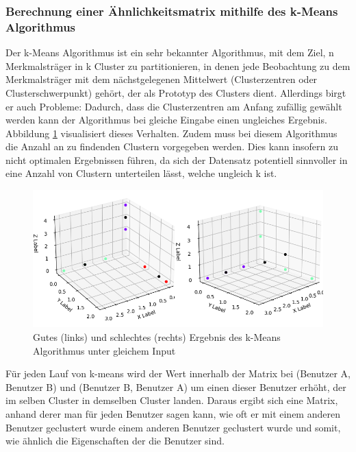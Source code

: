 \subsubsection{Berechnung einer Ähnlichkeitsmatrix mithilfe des k-Means Algorithmus}
Der k-Means Algorithmus ist ein sehr bekannter Algorithmus, mit dem Ziel, n Merkmalsträger in k Cluster zu partitionieren, in denen jede Beobachtung zu dem Merkmalsträger mit dem nächstgelegenen Mittelwert (Clusterzentren oder Clusterschwerpunkt) gehört, der als Prototyp des Clusters dient. Allerdings birgt er auch Probleme: Dadurch, dass die Clusterzentren am Anfang zufällig gewählt werden kann der Algorithmus bei gleiche Eingabe einen ungleiches Ergebnis. Abbildung \ref{fig:kmeans} visualisiert dieses Verhalten. Zudem muss bei diesem Algorithmus die Anzahl an zu findenden Clustern vorgegeben werden. Dies kann insofern zu nicht optimalen Ergebnissen führen, da sich der Datensatz potentiell sinnvoller in eine Anzahl von Clustern unterteilen lässt, welche ungleich k ist. 
\begin{figure}[h]
	\centering
	\includegraphics[width=\linewidth]{images/gutes_schlechtes_kmeans}
	\caption[]{Gutes (links) und schlechtes (rechts) Ergebnis des k-Means Algorithmus unter gleichem Input}
	\label{fig:kmeans}
\end{figure}
Für jeden Lauf von k-means wird der Wert innerhalb der Matrix bei (Benutzer A, Benutzer B) und (Benutzer B, Benutzer A) um einen dieser Benutzer erhöht, der im selben Cluster in demselben Cluster landen. Daraus ergibt sich eine Matrix, anhand derer man für jeden Benutzer sagen kann, wie oft er mit einem anderen Benutzer geclustert wurde einem anderen Benutzer geclustert wurde und somit, wie ähnlich die Eigenschaften der die Benutzer sind.
